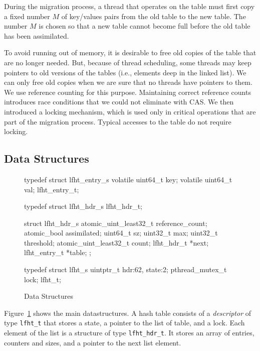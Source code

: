 During the migration process, a thread that operates on the table must
first copy a fixed number $M$ of key/values pairs from the old table
to the new table. The number $M$ is chosen so that a new table cannot
become full before the old table has been assimilated.

To avoid running out of memory, it is desirable to free old copies of
the table that are no longer needed. But, because of thread
scheduling, some threads may keep pointers to old versions of the
tables (i.e., elements deep in the linked list). We can only free old
copies when we are sure that no threads have pointers to them. We use
reference counting for this purpose. Maintaining correct reference
counts introduces race conditions that we could not eliminate with
CAS.  We then introduced a locking mechanism, which is used only in
critical operations that are part of the migration process. Typical
accesses to the table do not require locking.


\subsection{Data Structures}

\begin{figure}
\begin{center}
\begin{clisting}
typedef struct lfht_entry_s {
  volatile uint64_t  key;
  volatile uint64_t  val;
} lfht_entry_t;

typedef struct lfht_hdr_s lfht_hdr_t;

struct lfht_hdr_s {
  atomic_uint_least32_t reference_count;
  atomic_bool assimilated;
  uint64_t sz;
  uint32_t max;
  uint32_t threshold;
  atomic_uint_least32_t count;
  lfht_hdr_t *next;
  lfht_entry_t *table;
};


typedef struct lfht_s {
  uintptr_t hdr:62, state:2;
  pthread_mutex_t lock;
} lfht_t;
\end{clisting}
\end{center}
\caption{Data Structures}
\label{fig:datastructures}
\end{figure}

Figure~\ref{fig:datastructures} shows the main datastructures. A hash
table consists of a {\em descriptor\/} of type \texttt{lfht\_t} that
stores a state, a pointer to the list of table, and a lock. Each
element of the list is a structure of type \texttt{lfht\_hdr\_t}. It
stores an array of entries, counters and sizes, and a pointer to the
next list element.

